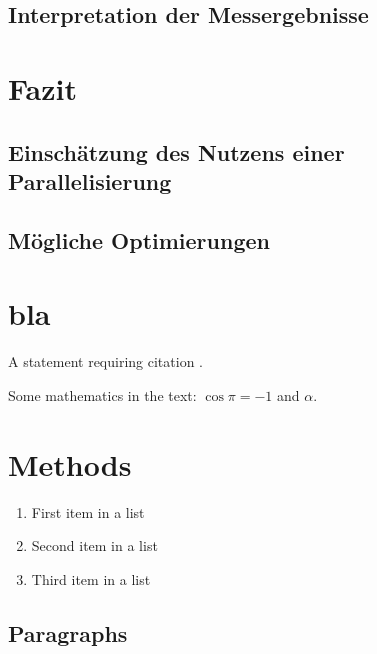 \documentclass[
10pt, %
a4paper, %
oneside, %
headinclude,footinclude, %
BCOR5mm, %
]{scrartcl}
\begin{document}
\subsection{Interpretation der Messergebnisse}

\section{Fazit}
\subsection{Einschätzung des Nutzens einer Parallelisierung}
\subsection{Mögliche Optimierungen}

\section{bla}

A statement requiring citation \cite{Figueredo:2009dg}.

\lipsum[1-3] %

Some mathematics in the text: $\cos\pi=-1$ and $\alpha$.
 

\section{Methods}

\lipsum[5] %

\begin{enumerate}[noitemsep] %
\item First item in a list
\item Second item in a list
\item Third item in a list
\end{enumerate}


\subsection{Paragraphs}
\end{document}
